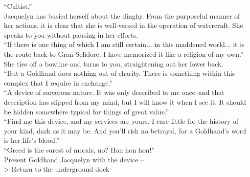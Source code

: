 “Cultist.”\\

Jacquelyn has busied herself about the dinghy. From the purposeful manner of her actions, it is clear that she is well-versed in the operation of watercraft. She speaks to you without pausing in her efforts.\\

“If there is one thing of which I am still certain... in this maddened world... it is the route back to Gran Selidore. I have memorized it like a religion of my own.”\\

She ties off a bowline and turns to you, straightening out her lower back.\\

“But a Goldhand does nothing out of charity. There is something within this complex that I require in exchange.”\\

“A device of sorcerous nature. It was only described to me once--and that description has slipped from my mind, but I will know it when I see it. It should be hidden somewhere typical for things of great value.”\\

“Find me this device, and my services are yours. I care little for the history of your kind, dark as it may be. And you’ll risk no betrayal, for a Goldhand’s word is her life’s blood.”\\

“Greed is the surest of morals, no? Hon hon hon!”\\

 Present Goldhand Jacquelyn with the device -- \\
> Return to the underground dock -- 